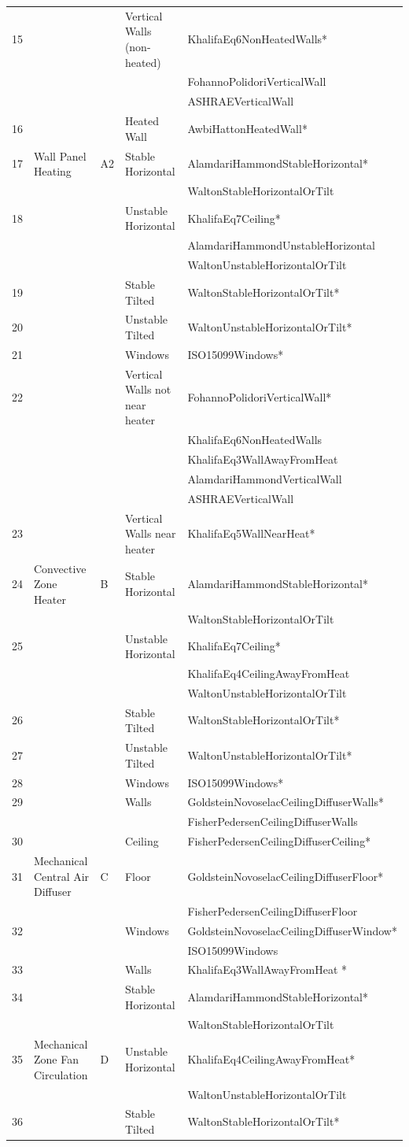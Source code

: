 \begin{longtable}[c]{p{0.25in}p{1.25in}p{0.25in}p{1.5in}p{2.75in}}
\midrule
15 & & & Vertical Walls (non-heated) & KhalifaEq6NonHeatedWalls* \tabularnewline
 & & & & FohannoPolidoriVerticalWall \tabularnewline
 & & & & ASHRAEVerticalWall \tabularnewline
16 & & & Heated Wall & AwbiHattonHeatedWall* \tabularnewline
17 & Wall Panel Heating & A2 & Stable Horizontal & AlamdariHammondStableHorizontal* \tabularnewline
 & & & & WaltonStableHorizontalOrTilt \tabularnewline
18 & & & Unstable Horizontal & KhalifaEq7Ceiling* \tabularnewline
 & & & & AlamdariHammondUnstableHorizontal \tabularnewline
 & & & & WaltonUnstableHorizontalOrTilt \tabularnewline
19 & & & Stable Tilted & WaltonStableHorizontalOrTilt* \tabularnewline
20 & & & Unstable Tilted & WaltonUnstableHorizontalOrTilt* \tabularnewline
21 & & & Windows & ISO15099Windows* \tabularnewline
\midrule
22 & & & Vertical Walls not near heater & FohannoPolidoriVerticalWall* \tabularnewline
 & & & & KhalifaEq6NonHeatedWalls \tabularnewline
 & & & & KhalifaEq3WallAwayFromHeat \tabularnewline
 & & & & AlamdariHammondVerticalWall \tabularnewline
 & & & & ASHRAEVerticalWall \tabularnewline
23 & & & Vertical Walls near heater & KhalifaEq5WallNearHeat* \tabularnewline
24 & Convective Zone Heater & B & Stable Horizontal & AlamdariHammondStableHorizontal* \tabularnewline
 & & & & WaltonStableHorizontalOrTilt \tabularnewline
25 & & & Unstable Horizontal & KhalifaEq7Ceiling* \tabularnewline
 & & & & KhalifaEq4CeilingAwayFromHeat \tabularnewline
 & & & & WaltonUnstableHorizontalOrTilt \tabularnewline
26 & & & Stable Tilted & WaltonStableHorizontalOrTilt* \tabularnewline
27 & & & Unstable Tilted & WaltonUnstableHorizontalOrTilt* \tabularnewline
28 & & & Windows & ISO15099Windows* \tabularnewline
\midrule
29 & & & Walls & GoldsteinNovoselacCeilingDiffuserWalls* \tabularnewline
 & & & & FisherPedersenCeilingDiffuserWalls \tabularnewline
30 & & & Ceiling & FisherPedersenCeilingDiffuserCeiling* \tabularnewline
31 & Mechanical Central Air Diffuser & C & Floor & GoldsteinNovoselacCeilingDiffuserFloor* \tabularnewline
 & & & & FisherPedersenCeilingDiffuserFloor \tabularnewline
32 & & & Windows & GoldsteinNovoselacCeilingDiffuserWindow* \tabularnewline
 & & & & ISO15099Windows \tabularnewline
\midrule
33 & & & Walls & KhalifaEq3WallAwayFromHeat * \tabularnewline
34 & & & Stable Horizontal & AlamdariHammondStableHorizontal* \tabularnewline
 & & & & WaltonStableHorizontalOrTilt \tabularnewline
35 & Mechanical Zone Fan Circulation & D & Unstable Horizontal & KhalifaEq4CeilingAwayFromHeat* \tabularnewline
 & & & & WaltonUnstableHorizontalOrTilt \tabularnewline
36 & & & Stable Tilted & WaltonStableHorizontalOrTilt* \tabularnewline

\end{longtable}
